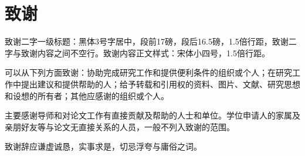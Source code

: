 
\chapter{致谢}
{\songti\xiaosi
致谢二字一级标题：黑体3号字居中，段前17磅，段后16.5磅，1.5倍行距，致谢二字与致谢内容之间不空行。致谢内容正文样式：宋体小四号，1.5倍行距。

可以从下列方面致谢：协助完成研究工作和提供便利条件的组织或个人；在研究工作中提出建议和提供帮助的人；给予转载和引用权的资料、图片、文献、研究思想和设想的所有者；其他应感谢的组织或个人。

主要感谢导师和对论文工作有直接贡献及帮助的人士和单位。学位申请人的家属及亲朋好友等与论文无直接关系的人员，一般不列入致谢的范围。

致谢辞应谦虚诚恳，实事求是，切忌浮夸与庸俗之词。 }

\newpage\quad %
